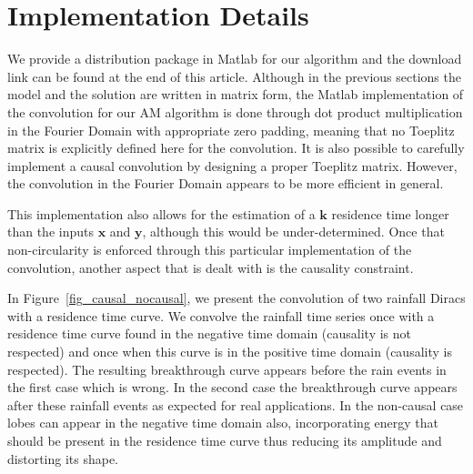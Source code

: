 \documentclass[]{elsarticle} %
\begin{document}
\section{Implementation Details}
\label{sec:implementation}

We provide a distribution package in Matlab for our algorithm and the download link can be found at the end of this article.
Although in the previous sections the model and the solution are written in matrix form, the Matlab implementation of the convolution for our AM algorithm is done through dot product multiplication in the Fourier Domain with appropriate zero padding,  meaning that no Toeplitz matrix is explicitly defined here for the convolution. It is also possible to carefully implement a causal convolution by designing a proper Toeplitz matrix. However, the convolution in the Fourier Domain appears to be more efficient in general.

This implementation also allows for the estimation of a $\textbf{k}$ residence time longer than the inputs $\textbf{x}$ and $\textbf{y}$, although this would be under-determined. Once that non-circularity is enforced through this particular implementation of the convolution, another aspect that is dealt with is the causality constraint.

In Figure~\ref{fig_causal_nocausal}, we present the convolution of two rainfall Diracs with a residence time curve. We convolve the rainfall time series once with a residence time curve found in the negative time domain (causality is not respected) and once when this curve is in the positive time domain (causality is respected). The resulting breakthrough curve appears before the rain events in the first case which is wrong. In the second case the breakthrough curve appears after these rainfall events as expected for real applications. In the non-causal case lobes can appear in the negative time domain also, incorporating energy that should be present in the residence time curve thus reducing its amplitude and distorting its shape.
\end{document}

